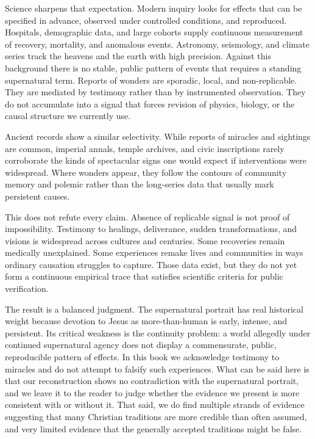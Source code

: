 Science sharpens that expectation.
Modern inquiry looks for effects that can be specified in advance, observed under controlled conditions, and reproduced.
Hospitals, demographic data, and large cohorts supply continuous measurement of recovery, mortality, and anomalous events.
Astronomy, seismology, and climate series track the heavens and the earth with high precision.
Against this background there is no stable, public pattern of events that requires a standing supernatural term.
Reports of wonders are sporadic, local, and non-replicable.
They are mediated by testimony rather than by instrumented observation.
They do not accumulate into a signal that forces revision of physics, biology, or the causal structure we currently use.

Ancient records show a similar selectivity.
While reports of miracles and sightings are common, imperial annals, temple archives, and civic inscriptions rarely corroborate the kinds of spectacular signs one would expect if interventions were widespread.
Where wonders appear, they follow the contours of community memory and polemic rather than the long-series data that usually mark persistent causes.

This does not refute every claim.
Absence of replicable signal is not proof of impossibility.
Testimony to healings, deliverance, sudden transformations, and visions is widespread across cultures and centuries.
Some recoveries remain medically unexplained.
Some experiences remake lives and communities in ways ordinary causation struggles to capture.
Those data exist, but they do not yet form a continuous empirical trace that satisfies scientific criteria for public verification.

The result is a balanced judgment.
The supernatural portrait has real historical weight because devotion to Jesus as more-than-human is early, intense, and persistent.
Its critical weakness is the continuity problem: a world allegedly under continued supernatural agency does not display a commensurate, public, reproducible pattern of effects.
In this book we acknowledge testimony to miracles and do not attempt to falsify such experiences.
What can be said here is that our reconstruction shows no contradiction with the supernatural portrait, and we leave it to the reader to judge whether the evidence we present is more consistent with or without it.
That said, we do find multiple strands of evidence suggesting that many Christian traditions are more credible than often assumed, and very limited evidence that the generally accepted traditions might be false.

